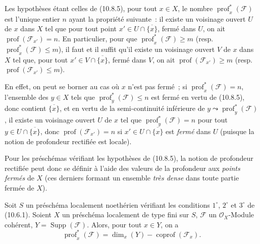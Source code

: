 \begin{corollary}[10.8.6]
\label{IV.10.8.6-fr}
Les hypothèses étant celles de \textup{(10.8.5)}, pour tout $x\in X$, le nombre
$\operatorname{prof}^{*}_{x}(\mathcal F)$ est l'unique entier $n$ ayant la propriété
suivante~: il existe un voisinage ouvert $U$ de $x$ dans $X$ tel que pour tout
point $x'\in U\cap\overline{\{x\}}$, fermé \textup{dans} $U$, on ait
$\operatorname{prof}(\mathcal F_{x'})=n$. En particulier, pour que
$\operatorname{prof}^{*}_{x}(\mathcal F)\geq m$ \textup{(resp.}
$\operatorname{prof}^{*}_{x}(\mathcal F)\leq m$\textup{)}, il faut et il suffit qu'il existe
un voisinage ouvert $V$ de $x$ dans $X$ tel que, pour tout
$x'\in V\cap\overline{\{x\}}$, fermé \textup{dans} $V$, on ait
$\operatorname{prof}(\mathcal F_{x'})\geq m$ \textup{(resp.}
$\operatorname{prof}(\mathcal F_{x'})\leq m$\textup{)}.
\end{corollary}

En effet, on peut se borner au cas où $x$ n'est pas fermé~; si
$\operatorname{prof}^{*}_{x}(\mathcal F)=n$, l'ensemble des $y\in X$ tels que
$\operatorname{prof}^{*}_{y}(\mathcal F)\leq n$ est fermé en vertu de (10.8.5), donc
contient $\overline{\{x\}}$, et en vertu de la semi-continuité inférieure de
$y\leadsto\operatorname{prof}^{*}_{y}(\mathcal F)$, il existe un voisinage ouvert $U$
de $x$ tel que $\operatorname{prof}^{*}_{y}(\mathcal F)=n$ pour tout
$y\in U\cap\overline{\{x\}}$, donc $\operatorname{prof}(\mathcal F_{x'})=n$ si
$x'\in U\cap\overline{\{x\}}$ est \emph{fermé} dans $U$ (puisque la notion de profondeur
rectifiée est locale).

Pour les préschémas vérifiant les hypothèses de (10.8.5), la notion de profondeur
rectifiée peut donc se définir à l'aide des valeurs de la profondeur aux
\emph{points fermés} de $X$ (ces derniers formant un ensemble \emph{très dense}
dans toute partie fermée de $X$).

\begin{proposition}[10.8.7]
\label{IV.10.8.7-fr}
Soit $S$ un préschéma localement noethérien vérifiant les conditions $1^\circ$,
$2^\circ$ et $3^\circ$ de \textup{(10.6.1)}. Soient $X$ un préschéma localement de type
fini sur $S$, $\mathcal F$ un $\mathcal O_X$-Module cohérent,
$Y=\operatorname{Supp}(\mathcal F)$. Alors, pour tout $x\in Y$, on a
\begin{equation}
\label{IV.10.8.7.1-fr}
\tag{10.8.7.1}
\operatorname{prof}^{*}_{x}(\mathcal F)
=\dim_x(Y)-\operatorname{coprof}(\mathcal F_x).
\end{equation}
\end{proposition}

